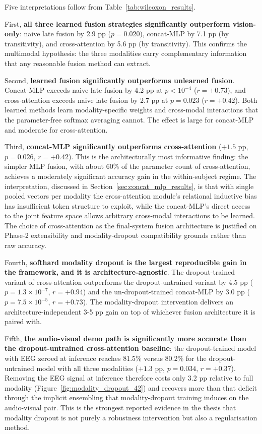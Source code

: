 Five interpretations follow from Table~\ref{tab:wilcoxon_results}.

First, \textbf{all three learned fusion strategies significantly outperform vision-only}: naive late fusion by 2.9 pp ($p=0.020$), concat-MLP by 7.1 pp (by transitivity), and cross-attention by 5.6 pp (by transitivity). This confirms the multimodal hypothesis: the three modalities carry complementary information that any reasonable fusion method can extract.

Second, \textbf{learned fusion significantly outperforms unlearned fusion}. Concat-MLP exceeds naive late fusion by 4.2 pp at $p < 10^{-4}$ ($r = +0.73$), and cross-attention exceeds naive late fusion by 2.7 pp at $p = 0.023$ ($r = +0.42$). Both learned methods learn modality-specific weights and cross-modal interactions that the parameter-free softmax averaging cannot. The effect is large for concat-MLP and moderate for cross-attention.

Third, \textbf{concat-MLP significantly outperforms cross-attention} ($+1.5$ pp, $p = 0.026$, $r = +0.42$). This is the architecturally most informative finding: the simpler MLP fusion, with about 60\% of the parameter count of cross-attention, achieves a moderately significant accuracy gain in the within-subject regime. The interpretation, discussed in Section~\ref{sec:concat_mlp_results}, is that with single pooled vectors per modality the cross-attention module's relational inductive bias has insufficient token structure to exploit, while the concat-MLP's direct access to the joint feature space allows arbitrary cross-modal interactions to be learned. The choice of cross-attention as the final-system fusion architecture is justified on Phase-2 extensibility and modality-dropout compatibility grounds rather than raw accuracy.

Fourth, \textbf{softhard modality dropout is the largest reproducible gain in the framework, and it is architecture-agnostic}. The dropout-trained variant of cross-attention outperforms the dropout-untrained variant by 4.5 pp ($p = 1.3 \times 10^{-7}$, $r = +0.94$) and the un-dropout-trained concat-MLP by 3.0 pp ($p = 7.5 \times 10^{-5}$, $r = +0.73$). The modality-dropout intervention delivers an architecture-independent 3-5 pp gain on top of whichever fusion architecture it is paired with.

Fifth, \textbf{the audio-visual demo path is significantly more accurate than the dropout-untrained cross-attention baseline}: the dropout-trained model with EEG zeroed at inference reaches 81.5\% versus 80.2\% for the dropout-untrained model with all three modalities ($+1.3$ pp, $p = 0.034$, $r = +0.37$). Removing the EEG signal at inference therefore costs only 3.2 pp relative to full modality (Figure~\ref{fig:modality_dropout_42}) and recovers more than that deficit through the implicit ensembling that modality-dropout training induces on the audio-visual pair. This is the strongest reported evidence in the thesis that modality dropout is not purely a robustness intervention but also a regularisation method.

